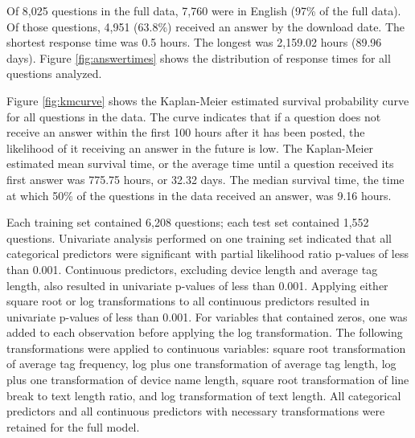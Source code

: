 \documentclass[preprint]{elsarticle}
\begin{document}
  Of 8,025 questions in the full data, 7,760 were in English (97\% of the full data). Of those questions, 4,951 (63.8\%) received an answer by the download date. The shortest response time was 0.5 hours. The longest was 2,159.02 hours (89.96 days). Figure \ref{fig:answertimes} shows the distribution of response times for all questions analyzed. 



Figure \ref{fig:kmcurve} shows the Kaplan-Meier estimated survival probability curve for all questions in the data. The curve indicates that if a question does not receive an answer within the first 100 hours after it has been posted, the likelihood of it receiving an answer in the future is low. The Kaplan-Meier estimated mean survival time, or the average time until a question received its first answer was 775.75 hours, or 32.32 days. The median survival time, the time at which 50\% of the questions in the data received an answer, was 9.16 hours.



Each training set contained 6,208 questions; each test set contained 1,552 questions. Univariate analysis performed on one training set indicated that all categorical predictors were significant with partial likelihood ratio p-values of less than 0.001. Continuous predictors, excluding device length and average tag length, also resulted in univariate p-values of less than 0.001. Applying either square root or log transformations to all continuous predictors resulted in univariate p-values of less than 0.001. For variables that contained zeros, one was added to each observation before applying the log transformation. The following transformations were applied to continuous variables: square root transformation of average tag frequency, log plus one transformation of average tag length, log plus one transformation of device name length, square root transformation of line break to text length ratio, and log transformation of text length. All categorical predictors and all continuous predictors with necessary transformations were retained for the full model. 
\end{document}
